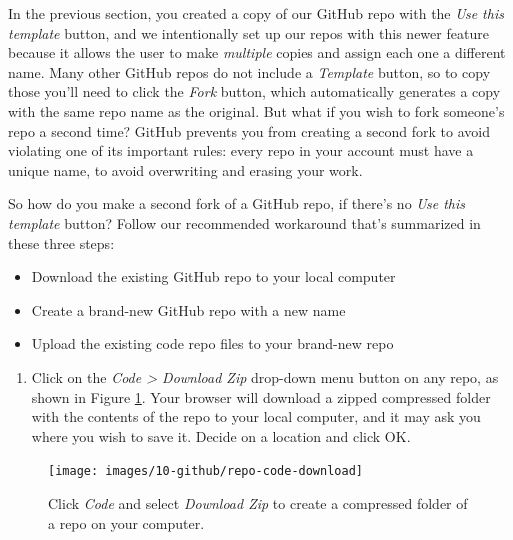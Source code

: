 \documentclass[
  english,
]{book}
\providecommand{\tightlist}{%
  \setlength{\itemsep}{0pt}\setlength{\parskip}{0pt}}
\begin{document}
In the previous section, you created a copy of our GitHub repo with the \emph{Use this template} button, and we intentionally set up our repos with this newer feature because it allows the user to make \emph{multiple} copies and assign each one a different name. Many other GitHub repos do not include a \emph{Template} button, so to copy those you'll need to click the \emph{Fork} button, which automatically generates a copy with the same repo name as the original. But what if you wish to fork someone's repo a second time? GitHub prevents you from creating a second fork to avoid violating one of its important rules: every repo in your account must have a unique name, to avoid overwriting and erasing your work.

So how do you make a second fork of a GitHub repo, if there's no \emph{Use this template} button? Follow our recommended workaround that's summarized in these three steps:

\begin{itemize}
\tightlist
\item
  Download the existing GitHub repo to your local computer
\item
  Create a brand-new GitHub repo with a new name
\item
  Upload the existing code repo files to your brand-new repo
\end{itemize}

\begin{enumerate}
\def\labelenumi{\arabic{enumi}.}
\tightlist
\item
  Click on the \emph{Code \textgreater{} Download Zip} drop-down menu button on any repo, as shown in Figure \ref{fig:repo-code-download}. Your browser will download a zipped compressed folder with the contents of the repo to your local computer, and it may ask you where you wish to save it. Decide on a location and click OK.
\end{enumerate}



\begin{figure}
\texttt{[image: images/10-github/repo-code-download]} \caption{Click \emph{Code} and select \emph{Download Zip} to create a compressed folder of a repo on your computer.}\label{fig:repo-code-download}
\end{figure}
\end{document}
